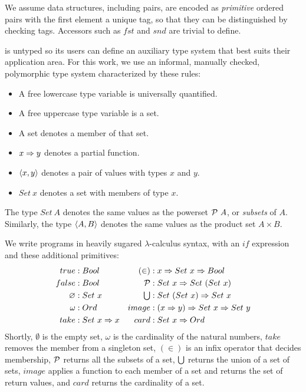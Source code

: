 \documentclass[preprint]{sigplanconf}
\begin{document}
We assume data structures, including pairs, are encoded as \emph{primitive} ordered pairs with the first element a unique tag, so that they can be distinguished by checking tags.
Accessors such as $fst$ and $snd$ are trivial to define.

\lzfclang is untyped so its users can define an auxiliary type system that best suits their application area.
For this work, we use an informal, manually checked, polymorphic type system characterized by these rules:
\begin{itemize}
	\item A free lowercase type variable is universally quantified.
	\item A free uppercase type variable is a set.
	\item A set denotes a member of that set.
	\item $x \Rightarrow y$ denotes a partial function.
	\item $\left\langle{x,y}\right\rangle$ denotes a pair of values with types $x$ and $y$.
	\item $Set~x$ denotes a set with members of type $x$.
\end{itemize}
The type $Set~A$ denotes the same values as the powerset $\mathcal{P}~A$, or \emph{subsets} of $A$.
Similarly, the type $\left\langle{A,B}\right\rangle$ denotes the same values as the product set $A \times B$.

We write \lzfclang programs in heavily sugared $\lambda$-calculus syntax, with an $if$ expression and these additional primitives:
\begin{equation}
\begin{aligned}
	\begin{aligned}
		true &: Bool \\
		false &: Bool \\
		\varnothing &: Set~x \\
		\omega &: Ord \\
		take &: Set~x \Rightarrow x \\
	\end{aligned}
	&\ \ \ 
	\begin{aligned}
		(\in) &: x \Rightarrow Set~x \Rightarrow Bool \\
		\mathcal{P} &: Set~x \Rightarrow Set~(Set~x) \\
		\textstyle\bigcup &: Set~(Set~x) \Rightarrow Set~x \\
		image &: (x \Rightarrow y) \Rightarrow Set~x \Rightarrow Set~y \\
		card &: Set~x \Rightarrow Ord \\
	\end{aligned} \\
\end{aligned}
\label{eqn:lzfc-prims}
\end{equation}
Shortly, $\emptyset$ is the empty set, $\omega$ is the cardinality of the natural numbers, $take$ removes the member from a singleton set, $(\in)$ is an infix operator that decides membership, $\mathcal{P}$ returns all the subsets of a set, $\textstyle\bigcup$ returns the union of a set of sets, $image$ applies a function to each member of a set and returns the set of return values, and $card$ returns the cardinality of a set.
\end{document}
